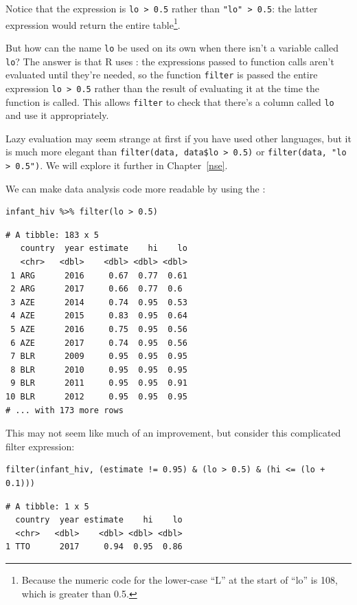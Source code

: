 Notice that the expression is \texttt{lo {\textgreater} 0.5} rather than \texttt{"lo" {\textgreater} 0.5}:
the latter expression would return the entire table\footnote{Because
  the numeric code for the lower-case ``L'' at the start of ``lo'' is 108,
  which is greater than 0.5.}.

But how can the name \texttt{lo} be used on its own
when there isn't a variable called \texttt{lo}?
The answer is that R uses :
the expressions passed to function calls aren't evaluated until they're needed,
so the function \texttt{filter} is passed the entire expression \texttt{lo~{\textgreater}~0.5}
rather than the result of evaluating it at the time the function is called.
This allows \texttt{filter} to check that there's a column called \texttt{lo} and use it appropriately.

Lazy evaluation may seem strange at first if you have used other languages,
but it is much more elegant than \texttt{filter(data, data\$lo {\textgreater} 0.5)} or \texttt{filter(data, "lo {\textgreater} 0.5")}.
We will explore it further in Chapter~\ref{nse}.

We can make data analysis code more readable by using the  \texttt{\pipe}:

\begin{lstlisting}
infant_hiv %>% filter(lo > 0.5)
\end{lstlisting}

\begin{lstlisting}
# A tibble: 183 x 5
   country  year estimate    hi    lo
   <chr>   <dbl>    <dbl> <dbl> <dbl>
 1 ARG      2016     0.67  0.77  0.61
 2 ARG      2017     0.66  0.77  0.6 
 3 AZE      2014     0.74  0.95  0.53
 4 AZE      2015     0.83  0.95  0.64
 5 AZE      2016     0.75  0.95  0.56
 6 AZE      2017     0.74  0.95  0.56
 7 BLR      2009     0.95  0.95  0.95
 8 BLR      2010     0.95  0.95  0.95
 9 BLR      2011     0.95  0.95  0.91
10 BLR      2012     0.95  0.95  0.95
# ... with 173 more rows
\end{lstlisting}

This may not seem like much of an improvement,
but consider this complicated filter expression:

\begin{lstlisting}
filter(infant_hiv, (estimate != 0.95) & (lo > 0.5) & (hi <= (lo + 0.1)))
\end{lstlisting}

\begin{lstlisting}
# A tibble: 1 x 5
  country  year estimate    hi    lo
  <chr>   <dbl>    <dbl> <dbl> <dbl>
1 TTO      2017     0.94  0.95  0.86
\end{lstlisting}

